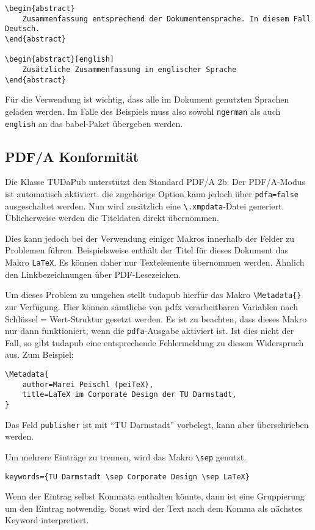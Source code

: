 \documentclass[
	ngerman,
	accentcolor=9c,%
	]{tudapub}
\let\code\texttt
\let\pck\textsf
\let\cls\textsf
\begin{document}
\begin{verbatim}
\begin{abstract}
	Zusammenfassung entsprechend der Dokumentensprache. In diesem Fall Deutsch.
\end{abstract}

\begin{abstract}[english]
	Zusätzliche Zusammenfassung in englischer Sprache
\end{abstract}
\end{verbatim}

Für die Verwendung ist wichtig, dass alle im Dokument genutzten Sprachen geladen werden. Im Falle des Beispiels muss also sowohl \code{ngerman} als auch \code{english} an das \pck{babel}-Paket übergeben werden.


\subsection{PDF/A Konformität}
Die Klasse TUDaPub unterstützt den Standard PDF/A 2b. Der PDF/A-Modus ist automatisch aktiviert. die zugehörige Option kann jedoch über \code{pdfa=false} ausgeschaltet werden.
Nun wird zusätzlich eine \code{\textbackslash.xmpdata}-Datei generiert. Üblicherweise werden die Titeldaten direkt übernommen.

Dies kann jedoch bei der Verwendung einiger Makros innerhalb der Felder zu Problemen führen. Beispielsweise enthält der Titel für dieses Dokument das Makro \code{\LaTeX}. Es können daher nur Textelemente übernommen werden. Ähnlich den Linkbezeichnungen über PDF-Lesezeichen.

Um dieses Problem zu umgehen stellt \cls{tudapub} hierfür das Makro \code{\textbackslash{}Metadata\{\}} zur Verfügung. Hier können sämtliche von \pck{pdfx} verarbeitbaren Variablen nach Schlüssel$=$Wert-Struktur gesetzt werden. Es ist zu beachten, dass dieses Makro nur dann funktioniert, wenn die \code{pdfa}-Ausgabe aktiviert ist. Ist dies nicht der Fall, so gibt \cls{tudapub} eine entsprechende Fehlermeldung zu diesem Widerspruch aus.
Zum Beispiel:
\begin{verbatim}
\Metadata{
	author=Marei Peischl (peiTeX),
	title=LaTeX im Corporate Design der TU Darmstadt,
}
\end{verbatim}
Das Feld \code{publisher} ist mit \enquote{TU Darmstadt} vorbelegt, kann aber überschrieben werden.

Um mehrere Einträge zu trennen, wird das Makro \code{\textbackslash{}sep} genutzt.
\begin{verbatim}
keywords={TU Darmstadt \sep Corporate Design \sep LaTeX}
\end{verbatim}
Wenn der Eintrag selbst Kommata enthalten könnte, dann ist eine Gruppierung um den Eintrag notwendig. Sonst wird der Text nach dem Komma als nächstes Keyword interpretiert.
\end{document}
